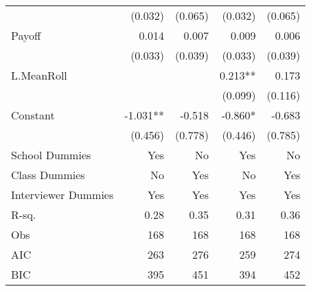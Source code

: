 \begin{table}[htbp]
\begin{tabular}{l*{4}{D{.}{.}{-1}}}
                    &             (0.032)   &             (0.065)   &             (0.032)   &             (0.065)   \\
Payoff              &               0.014   &               0.007   &               0.009   &               0.006   \\
                    &             (0.033)   &             (0.039)   &             (0.033)   &             (0.039)   \\
L.MeanRoll          &                       &                       &               0.213** &               0.173   \\
                    &                       &                       &             (0.099)   &             (0.116)   \\
Constant            &              -1.031** &              -0.518   &              -0.860*  &              -0.683   \\
                    &             (0.456)   &             (0.778)   &             (0.446)   &             (0.785)   \\
School Dummies      &                 Yes   &                  No   &                 Yes   &                  No   \\
Class Dummies       &                  No   &                 Yes   &                  No   &                 Yes   \\
Interviewer Dummies &                 Yes   &                 Yes   &                 Yes   &                 Yes   \\
\midrule
R-sq.               &                0.28   &                0.35   &                0.31   &                0.36   \\
Obs                 &                 168   &                 168   &                 168   &                 168   \\
AIC                 &                 263   &                 276   &                 259   &                 274   \\
BIC                 &                 395   &                 451   &                 394   &                 452   \\
\bottomrule
\end{tabular}
\end{table}
